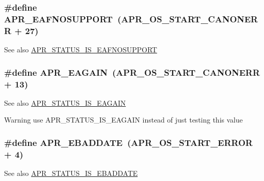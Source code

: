\subsubsection[{\texorpdfstring{A\+P\+R\+\_\+\+E\+A\+F\+N\+O\+S\+U\+P\+P\+O\+RT}{APR_EAFNOSUPPORT}}]{\setlength{\rightskip}{0pt plus 5cm}\#define A\+P\+R\+\_\+\+E\+A\+F\+N\+O\+S\+U\+P\+P\+O\+RT~({\bf A\+P\+R\+\_\+\+O\+S\+\_\+\+S\+T\+A\+R\+T\+\_\+\+C\+A\+N\+O\+N\+E\+RR} + 27)}\hypertarget{group__APR__Error_ga76b558840838bcb94a4811a8e52df7a6}{}\label{group__APR__Error_ga76b558840838bcb94a4811a8e52df7a6}
\begin{DoxySeeAlso}{See also}
\hyperlink{group__APR__STATUS__IS_ga9309aade5bd335ac5233170e8c120cb9}{A\+P\+R\+\_\+\+S\+T\+A\+T\+U\+S\+\_\+\+I\+S\+\_\+\+E\+A\+F\+N\+O\+S\+U\+P\+P\+O\+RT} 
\end{DoxySeeAlso}
\subsubsection[{\texorpdfstring{A\+P\+R\+\_\+\+E\+A\+G\+A\+IN}{APR_EAGAIN}}]{\setlength{\rightskip}{0pt plus 5cm}\#define A\+P\+R\+\_\+\+E\+A\+G\+A\+IN~({\bf A\+P\+R\+\_\+\+O\+S\+\_\+\+S\+T\+A\+R\+T\+\_\+\+C\+A\+N\+O\+N\+E\+RR} + 13)}\hypertarget{group__APR__Error_ga0b2a5ebb819de5ce93d326939b586578}{}\label{group__APR__Error_ga0b2a5ebb819de5ce93d326939b586578}
\begin{DoxySeeAlso}{See also}
\hyperlink{group__APR__STATUS__IS_ga9dd578bfcd76a2d997395608ae5b3a4e}{A\+P\+R\+\_\+\+S\+T\+A\+T\+U\+S\+\_\+\+I\+S\+\_\+\+E\+A\+G\+A\+IN} 
\end{DoxySeeAlso}
\begin{DoxyWarning}{Warning}
use A\+P\+R\+\_\+\+S\+T\+A\+T\+U\+S\+\_\+\+I\+S\+\_\+\+E\+A\+G\+A\+IN instead of just testing this value 
\end{DoxyWarning}
\subsubsection[{\texorpdfstring{A\+P\+R\+\_\+\+E\+B\+A\+D\+D\+A\+TE}{APR_EBADDATE}}]{\setlength{\rightskip}{0pt plus 5cm}\#define A\+P\+R\+\_\+\+E\+B\+A\+D\+D\+A\+TE~({\bf A\+P\+R\+\_\+\+O\+S\+\_\+\+S\+T\+A\+R\+T\+\_\+\+E\+R\+R\+OR} + 4)}\hypertarget{group__APR__Error_ga7911720c540a929cc08a2c25e606b56e}{}\label{group__APR__Error_ga7911720c540a929cc08a2c25e606b56e}
\begin{DoxySeeAlso}{See also}
\hyperlink{group__APR__STATUS__IS_gaf1313bed3538d6d57995bca164ebac20}{A\+P\+R\+\_\+\+S\+T\+A\+T\+U\+S\+\_\+\+I\+S\+\_\+\+E\+B\+A\+D\+D\+A\+TE} 
\end{DoxySeeAlso}
